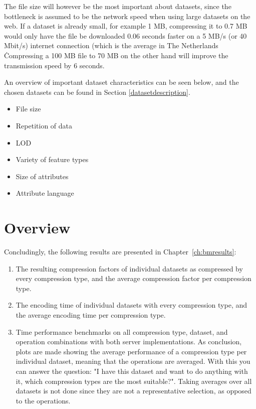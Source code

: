 The file size will however be the most important about datasets, since the bottleneck is assumed to be the network speed when using large datasets on the web.
If a dataset is already small, for example 1 MB, compressing it to 0.7 MB would only have the file be downloaded 0.06 seconds faster on a 5 MB/s (or 40 Mbit/s) internet connection (which is the average in The Netherlands \.
Compressing a 100 MB file to 70 MB on the other hand will improve the transmission speed by 6 seconds.

An overview of important dataset characteristics can be seen below, and the chosen datasets can be found in Section \ref{datasetdescription}.

\begin{itemize}
\item{File size}
\item{Repetition of data}
\item{LOD}
\item{Variety of feature types}
\item{Size of attributes}
\item{Attribute language}
\end{itemize}

\section{Overview}
Concludingly, the following results are presented in Chapter~\ref{ch:bmresults}:
\begin{enumerate}
\item The resulting compression factors of individual datasets as compressed by every compression type, and the average compression factor per compression type.
\item The encoding time of individual datasets with every compression type, and the average encoding time per compression type.
\item Time performance benchmarks on all compression type, dataset, and operation combinations with both server implementations. As conclusion, plots are made showing the average performance of a compression type per individual dataset, meaning that the operations are averaged. With this you can answer the question: "I have this dataset and want to do anything with it, which compression types are the most suitable?". Taking averages over all datasets is not done since they are not a representative selection, as opposed to the operations.
\end{enumerate}



